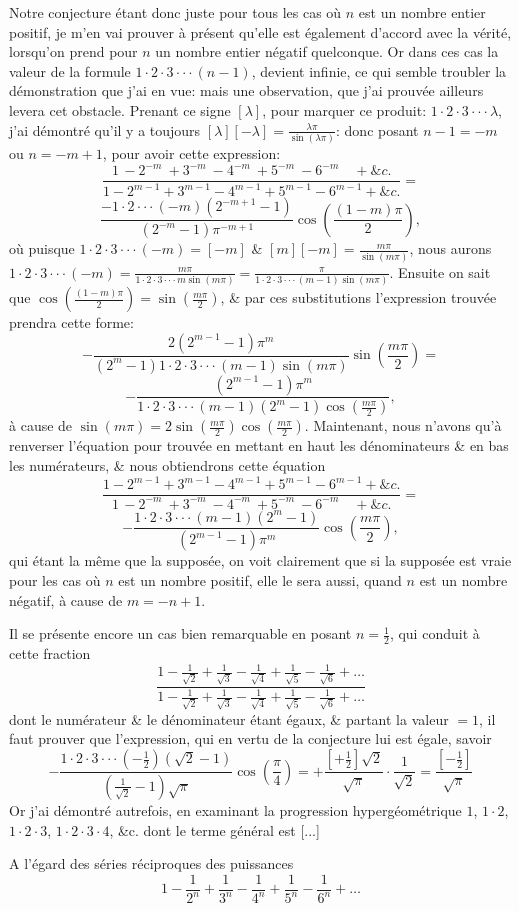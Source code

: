 \documentclass[12pt]{article}
\theoremstyle{definition}
\begin{document}
Notre conjecture étant donc juste pour tous les cas où $n$ est un nombre entier positif, je m'en vai prouver à présent qu'elle est également d'accord avec la vérité, lorsqu'on prend pour $n$ un nombre entier négatif quelconque. Or dans ces cas la valeur de la formule $1\cdot 2 \cdot 3 \cdot \cdot \cdot (n-1)$, devient infinie, ce qui semble troubler la démonstration que j'ai en vue: mais une observation, que j'ai prouvée ailleurs levera cet obstacle. Prenant ce signe $[\lambda]$, pour marquer ce produit: $1\cdot 2 \cdot 3 \cdot \cdot \cdot \lambda$, j'ai démontré qu'il y a toujours $[\lambda][-\lambda] = \frac{\lambda \pi}{\sin(\lambda \pi)}$: donc posant $n - 1 = -m$ ou $n = -m + 1$, pour avoir cette expression:
$$\frac{1 \, - 2^{-m} \ + 3^{-m} \ - 4^{-m} \ + 5^{-m} \ -  6^{-m} \quad + \&c.}{1 - 2^{m-1} + 3^{m-1} - 4^{m-1} + 5^{m-1} - 6^{m-1} + \&c.} =$$
$$\frac{-1\cdot 2 \cdot \cdot \cdot (-m)(2^{-m+1} - 1)}{(2^{-m} - 1)\pi^{-m+1}}\cos \left(\frac{(1-m) \pi }{2}\right),$$
où puisque $1\cdot 2 \cdot 3 \cdot \cdot \cdot (-m) = [-m]$ \& $[m][-m] = \frac{m\pi}{\sin(m \pi)}$, nous aurons $1\cdot 2 \cdot 3 \cdot \cdot \cdot (-m) = \frac{m\pi}{1\cdot 2 \cdot 3 \cdot \cdot \cdot m\sin(m \pi)} = \frac{\pi}{1\cdot 2 \cdot 3 \cdot \cdot \cdot (m-1)\sin(m \pi)}$. Ensuite on sait que $\cos(\frac{(1-m)\pi}{2}) = \sin(\frac{m\pi}{2})$, \& par ces substitutions l'expression trouvée prendra cette forme:
$$-\frac{2(2^{m-1} - 1)\pi^m}{(2^m - 1)1\cdot 2 \cdot 3\cdot \cdot \cdot (m-1)\sin(m\pi)}\sin\left(\frac{m\pi}{2}\right)=$$
$$-\frac{(2^{m-1} - 1)\pi^m}{1\cdot 2 \cdot 3\cdot \cdot \cdot (m-1)(2^m - 1)\cos(\frac{m\pi}{2})},$$
à cause de $\sin(m\pi) = 2 \sin(\frac{m\pi}{2})\cos(\frac{m\pi}{2})$. Maintenant, nous n'avons qu'à renverser l'équation pour trouvée en mettant en haut les dénominateurs \& en bas les numérateurs, \& nous obtiendrons cette équation
$$\frac{1 - 2^{m-1} + 3^{m-1} - 4^{m-1} + 5^{m-1} - 6^{m-1} + \&c.}{1 \, - 2^{-m} \ + 3^{-m} \ - 4^{-m} \ + 5^{-m} \ -  6^{-m} \quad + \&c.} =$$
$$-\frac{1\cdot 2 \cdot 3\cdot \cdot \cdot (m-1)(2^m - 1)}{(2^{m-1} - 1)\pi^m}\cos(\frac{m\pi}{2}),$$
qui étant la même que la supposée, on voit clairement que si la supposée est vraie pour les cas où $n$ est un nombre positif, elle le sera aussi, quand $n$ est un nombre négatif, à cause de $m = -n + 1$.

Il se présente encore un cas bien remarquable en posant $n = \frac{1}{2}$, qui conduit à cette fraction
$$\frac{\displaystyle 1 - \frac{1}{\sqrt{2}} + \frac{1}{\sqrt{3}} - \frac{1}{\sqrt{4}} + \frac{1}{\sqrt{5}} - \frac{1}{\sqrt{6}} + \dots}{\displaystyle 1 - \frac{1}{\sqrt{2}} + \frac{1}{\sqrt{3}} - \frac{1}{\sqrt{4}} + \frac{1}{\sqrt{5}} - \frac{1}{\sqrt{6}} + \dots}$$
dont le numérateur \& le dénominateur étant égaux, \& partant la valeur $= 1$, il faut prouver que l'expression, qui en vertu de la conjecture lui est égale, savoir
$$ - \frac{1\cdot 2 \cdot 3 \cdot \cdot \cdot (-\frac{1}{2})(\sqrt{2} - 1)}{(\frac{1}{\sqrt{2}} - 1)\sqrt{\pi}}\cos\left(\frac{\pi}{4}\right) = +\frac{[+\frac{1}{2}]\sqrt{2}}{\sqrt{\pi}}\cdot \frac{1}{\sqrt{2}} = \frac{[-\frac{1}{2}]}{\sqrt{\pi}}$$
Or j'ai démontré autrefois, en examinant la progression hypergéométrique $1$, $1\cdot 2$, $1\cdot 2 \cdot 3$, $1\cdot 2 \cdot 3 \cdot 4$, \&c. dont le terme général est [...]

A l'égard des séries réciproques des puissances 
$$1 - \frac{1}{2^n} + \frac{1}{3^n} - \frac{1}{4^n} + \frac{1}{5^n} - \frac{1}{6^n} + \dots$$
\end{document}
